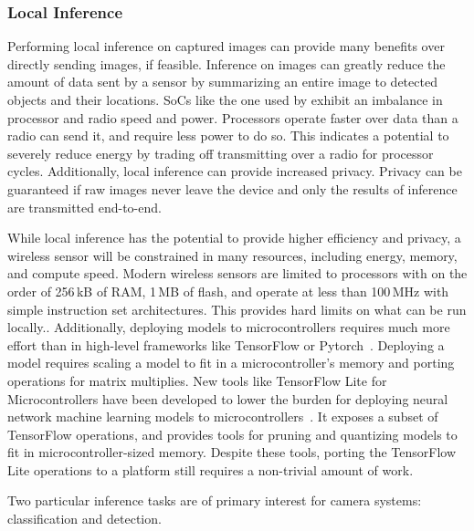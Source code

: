 \subsubsection{Local Inference}
Performing local inference on captured images can provide many benefits over directly sending images, if feasible. Inference on images can greatly reduce the amount of data sent by a sensor by summarizing an entire image to detected objects and their locations. SoCs like the one used by \name{} exhibit an imbalance in processor and radio speed and power. Processors operate faster over data than a radio can send it, and require less power to do so. This indicates a potential to severely reduce energy by trading off transmitting over a radio for processor cycles. Additionally, local inference can provide increased privacy. Privacy can be guaranteed if raw images never leave the device and only the results of inference are transmitted end-to-end.

While local inference has the potential to provide higher efficiency and privacy, a wireless sensor will be constrained in many resources, including energy, memory, and compute speed. Modern wireless sensors are limited to processors with on the order of 256\,kB of RAM, 1\,MB of flash, and operate at less than 100\,MHz with simple instruction set architectures. This provides hard limits on what can be run locally.. Additionally, deploying models to microcontrollers requires much more effort than in high-level frameworks like TensorFlow or Pytorch~\cite{8675201}. Deploying a model requires scaling a model to fit in a microcontroller's memory and porting operations for matrix multiplies. New tools like TensorFlow Lite for Microcontrollers have been developed to lower the burden for deploying neural network machine learning models to microcontrollers~\cite{tflm}. It exposes a subset of TensorFlow operations, and provides tools for pruning and quantizing models to fit in microcontroller-sized memory. Despite these tools, porting the TensorFlow Lite operations to a platform still requires a non-trivial amount of work.

Two particular inference tasks are of primary interest for camera systems: classification and detection.

